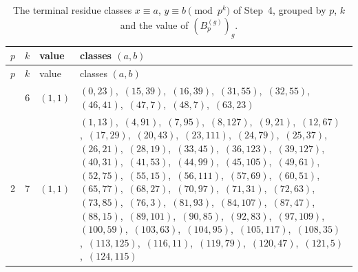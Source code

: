\documentclass[11pt]{article}
\begin{document}
\begingroup\small
\setlength{\LTcapwidth}{\textwidth}
\begin{longtable}{@{}rrl>{\raggedright\arraybackslash}p{}@{}}
\caption{The terminal residue classes $x\equiv a$, $y\equiv b\pmod{p^k}$ of Step~4, grouped by $p$, $k$ and the value of $(B^{(g)}_p)_g$.}\label{tab:local}\\
\hline $p$ & $k$ & value & classes $(a,b)$\\\hline\endfirsthead
\hline $p$ & $k$ & value & classes $(a,b)$\\\hline\endhead\hline\endfoot
2 & 6 & $(1,1)$ & $(0,23)$,\allowbreak\ $(15,39)$,\allowbreak\ $(16,39)$,\allowbreak\ $(31,55)$,\allowbreak\ $(32,55)$,\allowbreak\ $(46,41)$,\allowbreak\ $(47,7)$,\allowbreak\ $(48,7)$,\allowbreak\ $(63,23)$\\
2 & 7 & $(1,1)$ & $(1,13)$,\allowbreak\ $(4,91)$,\allowbreak\ $(7,95)$,\allowbreak\ $(8,127)$,\allowbreak\ $(9,21)$,\allowbreak\ $(12,67)$,\allowbreak\ $(17,29)$,\allowbreak\ $(20,43)$,\allowbreak\ $(23,111)$,\allowbreak\ $(24,79)$,\allowbreak\ $(25,37)$,\allowbreak\ $(26,21)$,\allowbreak\ $(28,19)$,\allowbreak\ $(33,45)$,\allowbreak\ $(36,123)$,\allowbreak\ $(39,127)$,\allowbreak\ $(40,31)$,\allowbreak\ $(41,53)$,\allowbreak\ $(44,99)$,\allowbreak\ $(45,105)$,\allowbreak\ $(49,61)$,\allowbreak\ $(52,75)$,\allowbreak\ $(55,15)$,\allowbreak\ $(56,111)$,\allowbreak\ $(57,69)$,\allowbreak\ $(60,51)$,\allowbreak\ $(65,77)$,\allowbreak\ $(68,27)$,\allowbreak\ $(70,97)$,\allowbreak\ $(71,31)$,\allowbreak\ $(72,63)$,\allowbreak\ $(73,85)$,\allowbreak\ $(76,3)$,\allowbreak\ $(81,93)$,\allowbreak\ $(84,107)$,\allowbreak\ $(87,47)$,\allowbreak\ $(88,15)$,\allowbreak\ $(89,101)$,\allowbreak\ $(90,85)$,\allowbreak\ $(92,83)$,\allowbreak\ $(97,109)$,\allowbreak\ $(100,59)$,\allowbreak\ $(103,63)$,\allowbreak\ $(104,95)$,\allowbreak\ $(105,117)$,\allowbreak\ $(108,35)$,\allowbreak\ $(113,125)$,\allowbreak\ $(116,11)$,\allowbreak\ $(119,79)$,\allowbreak\ $(120,47)$,\allowbreak\ $(121,5)$,\allowbreak\ $(124,115)$\\

\end{longtable}
\end{document}
